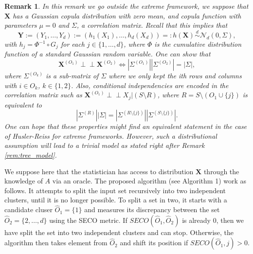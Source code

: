 \documentclass[11pt]{article}
\newtheorem{remark}{Remark}
\newcommand{\indep}{\perp \!\!\! \perp}
\begin{document}
	\begin{remark}
		 \label{rem:gaussian_copula}
		 In this remark we go outside the extreme framework, we suppose that $\textbf{X}$ has a Gaussian copula distribution with zero mean, and copula function with parameters $\mu = 0$ and $\Sigma$, a correlation matrix. Recall that this implies that
		 \begin{equation*}
		 	\textbf{Y} := (Y_1, \dots, Y_d) := (h_1(X_1), \dots, h_d(X_d)) =: h(\textbf{X}) \overset{d}{\sim} \mathcal{N}_d(0, \Sigma),
		 \end{equation*}
		 with $h_j = \Phi^{-1} \circ G_j$ for each $j \in \{1,\dots,d\}$, where $\Phi$ is the cumulative distribution function of a standard Gaussian random variable. One can show that
		 \begin{equation*}
		 	\textbf{X}^{(O_1)} \indep \textbf{X}^{(O_2)} \Longleftrightarrow  |\Sigma^{(O_1)}| |\Sigma^{(O_2)}| = |\Sigma|,
		 \end{equation*}
		 where $\Sigma^{(O_k)}$ is a sub-matrix of $\Sigma$ where we only kept the ith rows and columns with $i \in O_k$, $k \in \{1,2\}$. Also, conditional independencies are encoded in the correlation matrix such as $\textbf{X}^{(O_1)} \indep X_j | (S \setminus R)$, where $R = S \setminus (O_1 \cup \{j\})$ is equivalent to
		 \begin{equation*}
		 	|\Sigma^{(R)}| |\Sigma| = |\Sigma^{(R \setminus \{j\})}| |\Sigma^{(S \setminus \{j\})}|.
		 \end{equation*}
		 One can hope that these properties might find an equivalent statement in the case of Husler-Reiss for extreme frameworks. However, such a distributional assumption will lead to a trivial model as stated right after Remark \ref{rem:tree_model}.
	\end{remark}
	We suppose here that the statistician has access to distribution $\textbf{X}$ through the knowledge of $A$ via an oracle. The proposed algorithm (see Algorithm 1) work as follows. It attempts to split the input set recursively into two independent clusters, until it is no longer possible. To split a set in two, it starts with a candidate cluser $\hat{O}_1 = \{1\}$ and measures its discrepancy between the set $\hat{O}_2 = \{2,\dots,d\}$ using the SECO metric. If $SECO(\hat{O}_1, \hat{O}_2)$ is already 0, then we have split the set into two independent clusters and can stop. Otherwise, the algorithm then takes element from $\hat{O}_2$  and shift its position if $SECO(\hat{O}_1, j) > 0$.
\end{document}
